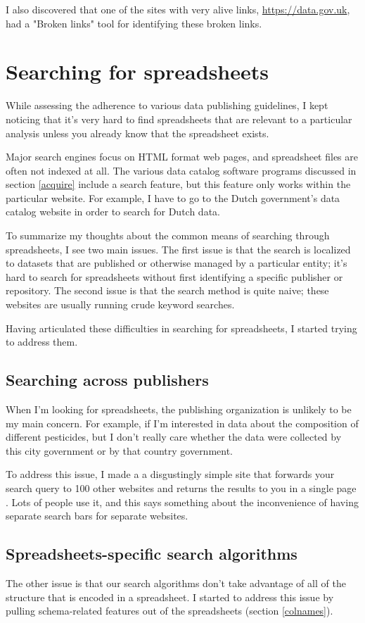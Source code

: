 \documentclass{acm_proc_article-sp}
\begin{document}
I also discovered that one of the sites with very alive links,
\url{https://data.gov.uk}, had a "Broken links" tool for identifying these
broken links.

\section{Searching for spreadsheets}
While assessing the adherence to various data publishing guidelines,
I kept noticing that it's very hard to find spreadsheets that are relevant
to a particular analysis unless you already know that the spreadsheet exists.

Major search engines focus on HTML format web pages, and spreadsheet files
are often not indexed at all. The various data catalog software programs
discussed in section \ref{acquire} include a search feature, but this feature
only works within the particular website. For example, I have to go to the
Dutch government's data catalog website in order to search for Dutch data.

To summarize my thoughts about the common means of searching through
spreadsheets, I see two main issues.
The first issue is that the search is localized to datasets that are published
or otherwise managed by a particular entity; it's hard to search for
spreadsheets without first identifying a specific publisher or repository.
The second issue is that the search method is quite naive; these websites are
usually running crude keyword searches.

Having articulated these difficulties in searching for spreadsheets, I started
trying to address them.

\subsection{Searching across publishers}
When I'm looking for spreadsheets, the publishing organization is unlikely
to be my main concern. For example, if I'm interested in data about the
composition of different pesticides, but I don't really care whether the
data were collected by this city government or by that country government.

To address this issue, I made a a disgustingly simple site that
forwards your search query to 100 other websites and returns the results
to you in a single page \cite{openprism}.
Lots of people use it, and this says something about the inconvenience of
having separate search bars for separate websites.

\subsection{Spreadsheets-specific search algorithms}
The other issue is that our search algorithms don't take advantage of all
of the structure that is encoded in a spreadsheet.
I started to address this issue by pulling schema-related features out
of the spreadsheets (section \ref{colnames}).
\end{document}
